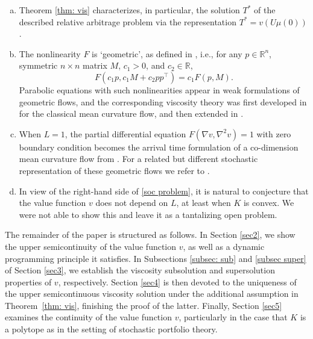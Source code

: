 \documentclass[11pt]{amsart}
\numberwithin{equation}{section}
\newcommand{\rr}{\mathbb{R}}
\begin{document}
\begin{rmk}
\begin{enumerate}[(a)]
\item Theorem \ref{thm: vis} characterizes, in particular, the solution $T^*$ of the described relative arbitrage problem via the representation $T^*=v(U\mu(0))$. \vskip 5.5pt
\item The nonlinearity $F$ is `geometric', as defined in \cite{BSS}, i.e., for any $p \in \rr^n$, symmetric $n\times n$ matrix $M$, $c_1>0$, and $c_2\in\rr$,
\begin{equation}
F(c_1 p, c_1 M + c_2pp^\top) = c_1 F(p,M).
\end{equation}
Parabolic equations with such nonlinearities appear in weak formulations of geometric flows, and the corresponding viscosity theory was first developed in \cite{cgg,evans_motion_1991,son} for the classical mean curvature flow, and then extended in \cite{BSS,ambrosio_level_1996}. \vskip 5.5pt
\item When $L=1$, the partial differential equation $F(\nabla v,\nabla^2 v)=1$ with zero boundary condition becomes the arrival time formulation of a co-dimension mean curvature flow from \cite{ambrosio_level_1996}. For a related but different stochastic representation of these geometric flows we refer to \cite{SoTo}. \vskip 5.5pt
\item In view of the right-hand side of \eqref{soc problem}, it is natural to conjecture that the value function $v$ does not depend on $L$, at least when $K$ is convex. We were not able to show this and leave it as a tantalizing open problem. 
\end{enumerate}
\end{rmk}

The remainder of the paper is structured as follows. In Section \ref{sec2}, we show the upper semicontinuity of the value function $v$, as well as a dynamic programming principle it satisfies. In Subsections \ref{subsec: sub} and \ref{subsec super} of Section \ref{sec3}, we establish the viscosity subsolution and supersolution properties of $v$, respectively. Section \ref{sec4} is then devoted to the uniqueness of the upper semicontinuous viscosity solution under the additional assumption in Theorem~\ref{thm: vis}, finishing the proof of the latter. Finally, Section \ref{sec5} examines the continuity of the value function $v$, particularly in the case that $K$ is a polytope as in the setting of stochastic portfolio theory.   

\medskip
\end{document}

